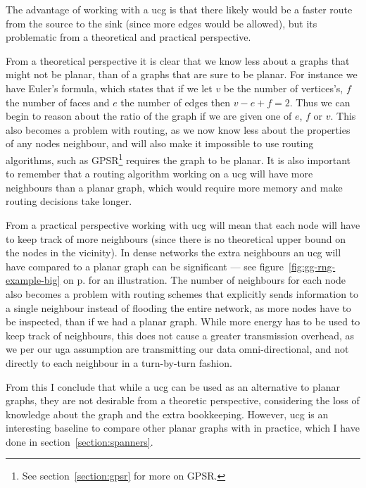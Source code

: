 The advantage of working with a \ac{ucg} is that there likely would be a faster route from the source to the sink (since more edges would be allowed), but its problematic from a theoretical and practical perspective.

From a theoretical perspective it is clear that we know less about a graphs that might not be planar, than of a graphs that are sure to be planar. For instance we have Euler's formula, which states that if we let $v$ be the number of vertices's, $f$ the number of faces and $e$ the number of edges then $v - e + f = 2$. Thus we can begin to reason about the ratio of the graph if we are given one of $e$, $f$ or $v$. This also becomes a problem with routing, as we now know less about the properties of any nodes neighbour, and will also make it impossible to use routing algorithms, such as GPSR\footnote{See section~\ref{section:gpsr} for more on GPSR.} requires the graph to be planar. It is also important to remember that a routing algorithm working on a \ac{ucg} will have more neighbours than a planar graph, which would require more memory and make routing decisions take longer.

From a practical perspective working with \ac{ucg} will mean that each node will have to keep track of more neighbours (since there is no theoretical upper bound on the nodes in the vicinity). In dense networks the extra neighbours an \ac{ucg} will have compared to a planar graph can be significant --- see figure~\ref{fig:gg-rng-example-big} on p. \pageref{fig:gg-rng-example-big} for an illustration. The number of neighbours for each node also becomes a problem with routing schemes that explicitly sends information to a single neighbour instead of flooding the entire network, as more nodes have to be inspected, than if we had a planar graph. While more energy has to be used to keep track of neighbours, this does not cause a greater transmission overhead, as we per our \ac{uga} assumption are transmitting our data omni-directional, and not directly to each neighbour in a turn-by-turn fashion.
 
From this I conclude that while a \ac{ucg} can be used as an alternative to planar graphs, they are not desirable from a theoretic perspective, considering the loss of knowledge about the graph and the extra bookkeeping. However, \ac{ucg} is an interesting baseline to compare other planar graphs with in practice, which I have done in section~\ref{section:spanners}.
 
